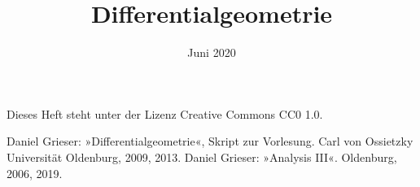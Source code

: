 \documentclass[a4paper,fleqn,11pt,dvipdfmx]{scrbook}
\title{Differentialgeometrie}
\date{Juni 2020}
\theoremstyle{rmbox}
\numberwithin{definition}{chapter}
\numberwithin{theorem}{chapter}
\begin{document}
\thispagestyle{empty}

\maketitle

Dieses Heft steht unter der Lizenz Creative Commons CC0 1.0.

\tableofcontents







\begin{thebibliography}{00}
 Daniel Grieser: »Differentialgeometrie«,
Skript zur Vorlesung. Carl von Ossietzky Universität Oldenburg, 2009, 2013.
 Daniel Grieser: »Analysis III«. Oldenburg, 2006, 2019.
\end{thebibliography}

\printindex
\end{document}
